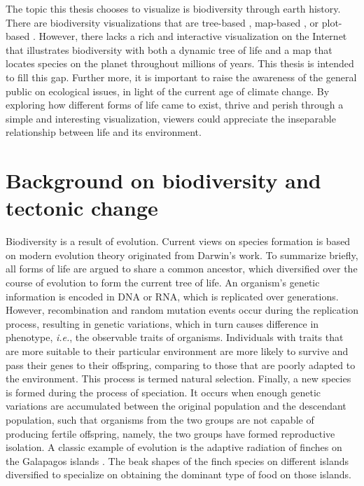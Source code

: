 \documentclass[11pt, a4paper,oneside,chapterprefix=false]{scrbook}
\begin{document}
The topic this thesis chooses to visualize is biodiversity through earth history. There are biodiversity visualizations that are tree-based \cite{block2012deeptree}, map-based \cite{janicki2016visualizing}, or plot-based \cite{liang2019bioactivity}. However, there lacks a rich and interactive visualization on the Internet that illustrates biodiversity with both a dynamic tree of life and a map that locates species on the planet throughout millions of years. This thesis is intended to fill this gap. Further more, it is important to raise the awareness of the general public on ecological issues, in light of the current age of climate change. By exploring how different forms of life came to exist, thrive and perish through a simple and interesting visualization, viewers could appreciate the inseparable relationship between life and its environment.

\section{Background on biodiversity and tectonic change} \label{sec: two}
Biodiversity is a result of evolution. Current views on species formation is based on modern evolution theory \cite{bowler1989evolution} originated from Darwin's work. To summarize briefly, all forms of life are argued to share a common ancestor, which diversified over the course of evolution to form the current tree of life. An organism's genetic information is encoded in DNA or RNA, which is replicated over generations. However, recombination and random mutation events occur during the replication process, resulting in genetic variations, which in turn causes difference in phenotype, \emph{i.e.}, the observable traits of organisms. Individuals with traits that are more suitable to their particular environment are more likely to survive and pass their genes to their offspring, comparing to those that are poorly adapted to the environment. This process is termed natural selection. Finally, a new species is formed during the process of speciation. It occurs when enough genetic variations are accumulated between the original population and the descendant population, such that organisms from the two groups are not capable of producing fertile offspring, namely, the two groups have formed reproductive isolation. A classic example of evolution is the adaptive radiation of finches on the Galapagos islands \cite{lack1983darwin}. The beak shapes of the finch species on different islands diversified to specialize on obtaining the dominant type of food on those islands.  \\
\end{document}
